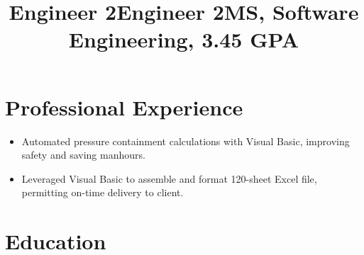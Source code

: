 \documentclass[12pt]{res} %
\begin{document}
\begin{resume}
      \section{Professional Experience}
      \vspace{2pt}

        \title{\textbf{Engineer 2}}
        \begin{position}
          \vspace{-14pt}
          \begin{itemize}[leftmargin=-0.4cm, rightmargin=0.8cm]
          \itemsep0em
          \item Automated pressure containment calculations with Visual Basic, improving safety and saving manhours.
          \end{itemize}
        \end{position}
        \vspace{-10pt}

        \title{\textbf{Engineer 2}}
        \begin{position}
          \vspace{-14pt}
          \begin{itemize}[leftmargin=-0.4cm, rightmargin=0.8cm]
          \itemsep0em
              \item Leveraged Visual Basic to assemble and format 120-sheet Excel file, permitting on-time delivery to client.
          \end{itemize}
        \end{position}
        \vspace{-10pt}

        \section{Education}
        \vspace{2pt}

        \title{\textbf{MS, Software Engineering, 3.45 GPA}}
        \begin{position}
            \vspace{-14pt}
        \end{position}
        \vspace{-10pt}


\end{resume}
\end{document}
